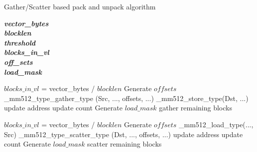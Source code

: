\documentclass[conference]{IEEEtran}
\begin{document}
\begin{algorithm}%
\caption{Gather/Scatter based pack and unpack algorithm}\label{fig:gs_algorithm}

\textbf{\textit{vector\_bytes}} \\
\textbf{\textit{blocklen}} \\
\textbf{\textit{threshold}} \\
\textbf{\textit{blocks\_in\_vl}} \\
\textbf{\textit{off\_sets}} \\
\textbf{\textit{load\_mask}} \\ \vspace{0.5 cm}
\begin{algorithmic}[1]

    \EndFor
\Else
  \State $blocks\_in\_vl$ = vector\_bytes / $blocklen$
  \State Generate $offsets$
    \State \_mm512\_type\_gather\_type (Src, ..., offsets, ...)
    \State \_mm512\_store\_type(Dst, ...)
    \State update address
    \State update count
  \EndFor
  \State Generate $load\_mask$
  \State gather remaining blocks
\EndIf
\EndProcedure
\end{algorithmic}
\begin{algorithmic}[1]

    \EndFor
\Else
  \State $blocks\_in\_vl$ = vector\_bytes / $blocklen$
  \State Generate $offsets$
    \State \_mm512\_load\_type(..., Src)
    \State \_mm512\_type\_scatter\_type (Dst, ..., offsets, ...)
    \State update address
    \State update count
  \EndFor
  \State Generate $load\_mask$
  \State scatter remaining blocks
\EndIf
\EndProcedure
\end{algorithmic}
\end{algorithm}
\end{document}
